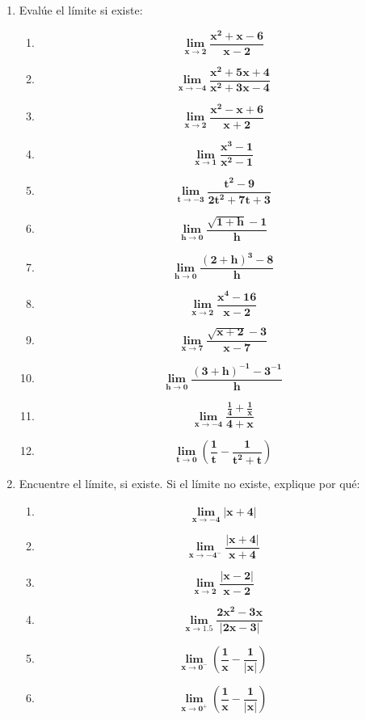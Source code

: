 \documentclass[12pt]{article}
\begin{document}
\begin{enumerate}
            
            \item Evalúe el límite si existe:
                \begin{enumerate}[label=\textbf{\arabic*)}] 
                    \item \[\bm{\lim_{x \to 2} \frac{x ^2 + x - 6}{x - 2}}\]
                    \item \[\bm{\lim_{x \to -4} \frac{x ^2 + 5x +4}{x ^2 + 3x - 4}}\]
                    \item \[\bm{\lim_{x \to 2} \frac{x ^2 - x + 6}{x + 2}}\]
                    \item \[\bm{\lim_{x \to 1} \frac{x ^3 - 1}{x ^2 - 1}}\]
                    \item \[\bm{\lim_{t \to -3} \frac{t ^2 - 9}{2t ^2 + 7t + 3}}\]
                    \item \[\bm{\lim_{h \to 0} \frac{\sqrt{1 + h} - 1}{h}}\]
                    \item \[\bm{\lim_{h \to 0} \frac{(2 + h) ^3 - 8}{h}}\]
                    \item \[\bm{\lim_{x \to 2} \frac{x ^4 - 16}{x - 2}}\]
                    \item \[\bm{\lim_{x \to 7} \frac{\sqrt{x + 2} - 3}{x - 7}}\]
                    \item \[\bm{\lim_{h \to 0} \frac{(3 + h)^{-1} - 3^{-1}}{h}}\]
                    \item \[\bm{\lim_{x \to -4} \frac{\frac{1}{4} + \frac{1}{x}}{4 + x}}\]
                    \item \[\bm{\lim_{t \to 0} \left(\frac{1}{t} - \frac{1}{t ^2 + t}\right)}\]
                \end{enumerate}
            
            \item Encuentre el límite, si existe. Si el límite no existe, explique por qué:
                \begin{enumerate}[label=\textbf{\arabic*)}] 
                    \item \[\bm{\lim_{x \to -4} \left| x + 4 \right|}\]
                    \item \[\bm{\lim_{x \to -4 ^-} \frac{\left| x + 4 \right|}{x + 4}}\]
                    \item \[\bm{\lim_{x \to 2} \frac{\left| x - 2 \right|}{x - 2}}\]
                    \item \[\bm{\lim_{x \to 1.5} \frac{2x ^2 - 3x}{\left| 2x - 3 \right|}}\]
                    \item \[\bm{\lim_{x \to 0 ^-} \left(\frac{1}{x} - \frac{1}{\left| x \right|}\right)}\]
                    \item \[\bm{\lim_{x \to 0 ^+} \left(\frac{1}{x} - \frac{1}{\left| x \right|}\right)}\]
                \end{enumerate}



\end{enumerate}
\end{document}
